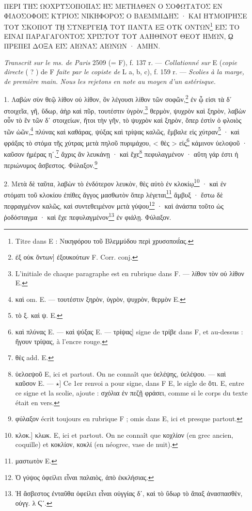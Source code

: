 \documentclass[a4paper, 11pt, oneside, polutonikogreek, french]{article}
\begin{document}
ΠΕΡΙ ΤΗΣ ΩΟΧΡΥΣΟΠΟΙΙΑΣ ΗΣ ΜΕΤΗΛΘΕΝ Ο ΣΟΦΩΤΑΤΟΣ ΕΝ ΦΙΛΟΣΟΦΟΙΣ ΚΥΡΙΟΣ ΝΙΚΗΦΟΡΟΣ Ο ΒΛΕΜΜΙΔΗΣ · ΚΑΙ ΗΥΜΟΙΡΗΣΕ ΤΟΥ ΣΚΟΠΟΥ Τῌ ΣΥΝΕΡΓΕΙᾼ ΤΟΥ ΠΑΝΤΑ ΕΞ ΟΥΚ ΟΝΤΩΝ\footnote{Titre dans E : Νικηφόρου τοῦ Βλεμμύδου περὶ χρυσοποιΐας.} ΕΙΣ ΤΟ ΕΙΝΑΙ ΠΑΡΑΓΑΓΟΝΤΟΣ ΧΡΙΣΤΟΥ ΤΟΥ ΑΛΗΘΙΝΟΥ ΘΕΟΥ ΗΜΩΝ, ῼ ΠΡΕΠΕΙ ΔΟΞΑ ΕΙΣ ΑΙΩΝΑΣ ΑΙΩΝΩΝ · ΑΜΗΝ.

\emph{Transcrit sur le ms. de Paris} 2509 (= F), f. 137 r. --- \emph{Collationné sur} E (\emph{copie directe} ( ? ) de F \emph{faite par le copiste de} L a, b, c), f. 159 r. --- \emph{Scolies à la marge, de première main. Nous les rejetons en note au moyen d'un astérisque.}

1. Λαβὼν σὺν θεῷ λίθον οὐ λίθον, ὃν λέγουσι λίθον τῶν σοφῶν,\footnote{ἐξ οὐκ ὄντων] ἐξουκούτων F. Corr. conj.} ἐν ᾧ εἰσι τὰ δʹ στοιχεῖα, γῆ, ὕδωρ, ἀὴρ καὶ πῦρ, τουτέστιν ὑγρὸν,\footnote{L'initiale de chaque paragraphe est en rubrique dans F. --- λίθον τὸν οὐ λίθον E.} θερμὸν, ψυχρὸν καὶ ξηρὸν, λαβὼν οὖν τὸ ἓν τῶν δʹ στοιχείων, ἤτοι τὴν γῆν, τὸ ψυχρὸν καὶ ξηρὸν, ὅπερ ἐστὶν ὁ φλοιὸς τῶν ὠῶν,\footnote{καὶ om. E. --- τουτέστιν ξηρὸν, ὑγρὸν, ψυχρὸν, θερμὸν E.} πλύνας καὶ καθάρας, ψύξας καὶ τρίψας καλῶς, ἔμβαλε εἰς χύτραν\footnote{τὸ ξ. καὶ ψ. E.} · καὶ φράξας τὸ στόμα τῆς χύτρας μετὰ πηλοῦ πυριμάχου, < θὲς > εἰς\footnote{καὶ πλύνας E. --- καὶ ψύξας E. --- τρίψας] signe de τρίβε dans F, et au-dessus : ἤγουν τρίψας, à l'encre rouge.} κάμινον ὑελοψοῦ · καῦσον ἡμέρας ηʹ,\footnote{θὲς add. E.} ἄχρις ἂν λευκάνῃ · καὶ ἔχε\footnote{ὑελοεψοῦ E, ici et partout. On ne connaît que ὑελέψης, ὑελέψου. --- καὶ καῦσον E. --- $\star$] Ce 1er renvoi a pour signe, dans F E, le sigle de ὅτι. E, entre ce signe et la scolie, ajoute : σχόλια ἐν πεζῇ φράσει, comme si le corps du texte était en vers.} πεφυλαγμένον · αὕτη γάρ ἐστι ἡ περιώνυμος ἄσβεστος. Φύλαξον.\footnote{φύλαξον écrit toujours en rubrique F ; omis dans E, ici et presque partout.}

2. Μετὰ δὲ ταῦτα, λαβὼν τὸ ἐνδότερον λευκὸν, θὲς αὐτὸ ἐν κλοκίῳ\footnote{κλοκ.] κλωκ. E, ici et partout. On ne connaît que κοχλίον (en grec ancien, coquille) et κοκλίον, κοκλί (en néogrec, vase de nuit).} · καὶ ἐν στόματι τοῦ κλοκίου ἐπίθες ἄγγος μασθωτὸν ὅπερ λέγεται\footnote{μαστωτὸν E.} ἄμβυξ · ἔστω δὲ πεφραγμένον καλῶς, καὶ συντεθειμένον μετὰ γύψου\footnote{Ὁ γύψος ὀφείλει εἶναι παλαιὸς, ἀπὸ ἐκκλήσιας.} · καὶ ἀνάσπα τοῦτο ὡς ῥοδόσταγμα · καὶ ἔχε πεφυλαγμένον\footnote{Ἡ ἄσβεστος ἐνταῦθα ὀφείλει εἶναι οὐγγίας δʹ, καὶ τὸ ὕδωρ τὸ ἅπαξ ἀνασπασθὲν, οὐγγ. λ Ϛʹ.} ἐν φιάλῃ. Φύλαξον.
\end{document}
